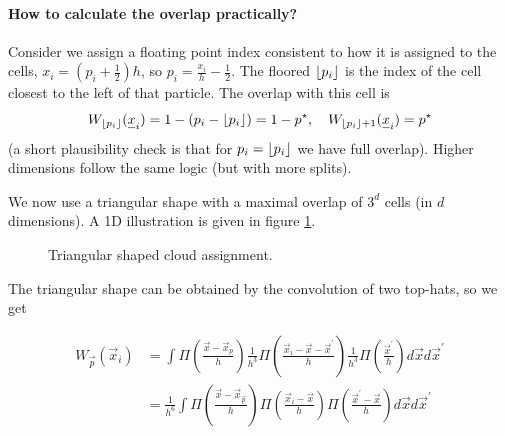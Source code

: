 \paragraph*{How to calculate the overlap practically?} Consider we assign a floating
point index consistent to how it is assigned to the cells, $x_i = (p_i + \frac{1}{2})h$,
so $p_i = \frac{x_i}{h} - \frac{1}{2}$. The floored $\lfloor p_i\rfloor$ is the index of the cell
closest to the left of that particle. The overlap with this cell is
\begin{equation}
     W_{\floor{p_i}}(\vec{x}_i) = 1 - (p_i - \floor{p_i}) = 1 - p^\star, \quad W_{\floor{p_i} + 1}(\vec{x}_i) = p^\star
\end{equation}
(a short plausibility check is that for $p_i = \lfloor p_i\rfloor$ we have full overlap). Higher
dimensions follow the same logic (but with more splits).

We now use a triangular shape with a maximal overlap of $3^d$ cells (in $d$ dimensions). A 1D illustration
is given in figure \ref{fig:tsc}.

\begin{figure}[H]
    \centering
    
    \caption{Triangular shaped cloud assignment.}
    \label{fig:tsc}
\end{figure}

The triangular shape can be obtained by the convolution of two top-hats, so we get

\begin{equation}
    \begin{aligned}
    W_{\vec{p}}\left(\vec{x}_i\right) & =\int \Pi\left(\frac{\vec{x}-\vec{x}_p}{h}\right) \frac{1}{h^3} \Pi\left(\frac{\vec{x}_i-\vec{x}-\vec{x}^{\prime}}{h}\right) \frac{1}{h^3} \Pi\left(\frac{\vec{x}^{\prime}}{h}\right) d \vec{x} d \vec{x}^{\prime} \\
    & =\frac{1}{h^6} \int \Pi\left(\frac{\vec{x}-\vec{x}_{\vec{p}}}{h}\right) \Pi\left(\frac{\vec{x}_i-\vec{x}}{h}\right) \Pi\left(\frac{\vec{x}^{\prime}-\vec{x}}{h}\right) d \vec{x} d \vec{x}^{\prime}
    \end{aligned}
\end{equation}

